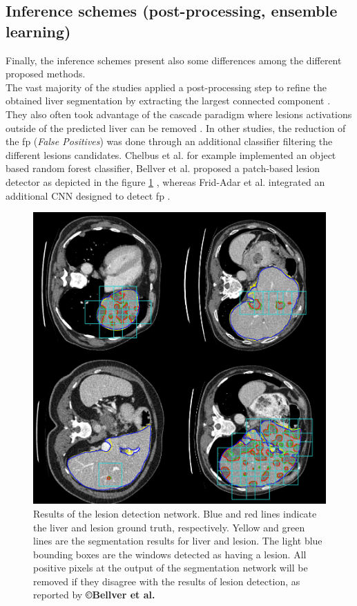 \subsection{Inference schemes (post-processing, ensemble learning)}


Finally, the inference schemes present also some differences among the
different proposed methods. \\
The vast majority of the studies applied a post-processing step to
refine the obtained liver segmentation by extracting the largest
connected component \cite{Li2018, Han2017, Yuan2017, Bellver2017, Kaluva2018}. They
also often took advantage of the cascade paradigm where lesions
activations outside of the predicted liver can be removed \cite{Li2018, Yuan2017, Vorontsov2018}. In other studies, the reduction of the \ac{fp}
(\emph{False Positives}) was done through an additional classifier
filtering the different lesions candidates. Chelbus et al. \cite{Chlebus2018} for
example implemented an object based random forest classifier,
Bellver et al. proposed a patch-based lesion detector as
depicted in the figure \ref{Bellver_predResults} \cite{Bellver2017}, whereas Frid-Adar et al. integrated an
additional CNN designed to detect \ac{fp} \cite{Frid-adar2017}.

\begin{figure}[th!]
	\centering
	\includegraphics[width=0.5\linewidth]{images/Bellver2017_Fig2}
	\caption{Results of the lesion detection network. Blue and red lines indicate the liver and lesion ground truth, respectively. Yellow and green lines are the segmentation results for liver and lesion. The light blue bounding boxes are the windows detected as having a lesion. All positive pixels at the output of the segmentation network will be removed if they disagree with the results of lesion detection, as reported by \textbf{©Bellver et al. \cite{Bellver2017}}}
	\label{Bellver_predResults}
\end{figure}


